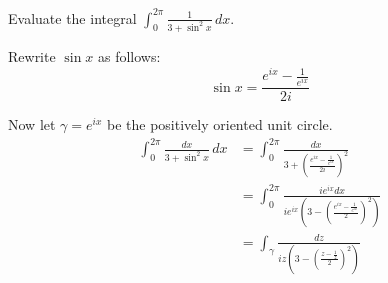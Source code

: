 \documentclass{homework}
\begin{document}
                                                                                     \begin{problem}
                                                                                       Evaluate the integral $\displaystyle\int_{0}^{2\pi} \frac{1}{3 + \sin^2 x} \, dx$.
                                                                                       \end{problem}
                                                                                       \begin{solution}
                                                                                       Rewrite $\sin x$ as follows:
                                                                                       \[
                                                                                       \sin x = \frac{e^{ix} - \frac{1}{e^{ix}}}{2i}
                                                                                       \]

                                                                                       Now let $\gamma=e^{ix}$ be the positively oriented unit circle.
                                                                                       \begin{align*}
                                                                                       \int_{0}^{2\pi} \frac{dx}{3 + \sin^2 x} \, dx &= 
                                                                                       \int_{0}^{2\pi} \frac{dx}{3 + \left(\frac{e^{ix} - \frac{1}{e^{ix}}}{2i}\right)^2}\\
                                                                                       &= \int_{0}^{2\pi} \frac{ie^{ix}dx}{ie^{ix}\left(3 - \left(\frac{e^{ix} - \frac{1}{e^{ix}}}{2}\right)^2\right)}\\
                                                                                       &= \int_\gamma \frac{dz}{iz\left(3 - \left(\frac{z - \frac{1}{z}}{2}\right)^2\right)}
                                                                                       \end{align*}


\end{solution}
\end{document}
